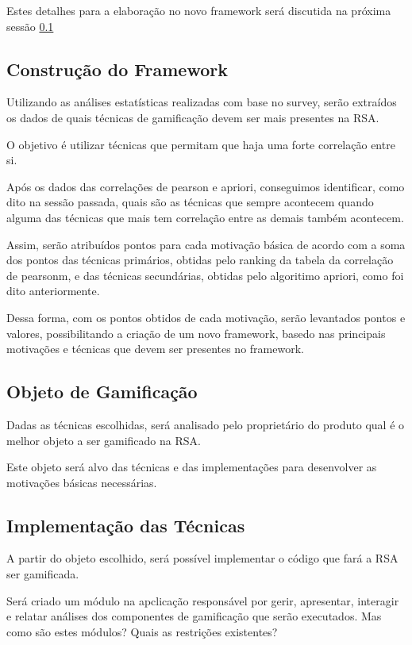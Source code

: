 Estes detalhes para a elaboração no novo framework será discutida na próxima sessão \ref{sub:constru_o_do_framework}

\subsection{Construção do Framework}
\label{sub:constru_o_do_framework}
Utilizando as análises estatísticas realizadas com base no survey, serão extraídos os dados de quais técnicas de gamificação
devem ser mais presentes na RSA.

O objetivo é  utilizar técnicas que permitam que haja uma forte correlação entre si.

Após os dados das correlações de pearson e apriori, conseguimos identificar, como dito na sessão passada, quais são as técnicas
que sempre acontecem quando alguma das técnicas que mais tem correlação entre as demais também acontecem.

Assim, serão atribuídos pontos para cada motivação básica de acordo com a soma dos pontos das técnicas primários, obtidas pelo ranking da
tabela da correlação de pearsonm, e das técnicas secundárias, obtidas pelo algoritimo apriori, como foi dito anteriormente.

Dessa forma, com os pontos obtidos de cada motivação, serão levantados pontos e valores, possibilitando a criação de um novo framework,
basedo nas principais motivações e técnicas que devem ser presentes no framework.

\subsection{Objeto de Gamificação}
\label{sub:objeto_de_gamifica_o}
Dadas as técnicas escolhidas, será analisado pelo proprietário do produto qual é o melhor objeto a ser gamificado na RSA.

Este objeto será alvo das técnicas e das implementações para desenvolver as motivações básicas necessárias.


\subsection{Implementação das Técnicas}
\label{sub:implementa_o_das_t_cnicas}
A partir do objeto escolhido, será possível implementar o código que fará a RSA ser gamificada.

Será criado um módulo na apclicação responsável por gerir, apresentar, interagir e relatar análises
dos componentes de gamificação que serão executados. Mas como são estes módulos? Quais as restrições existentes?

